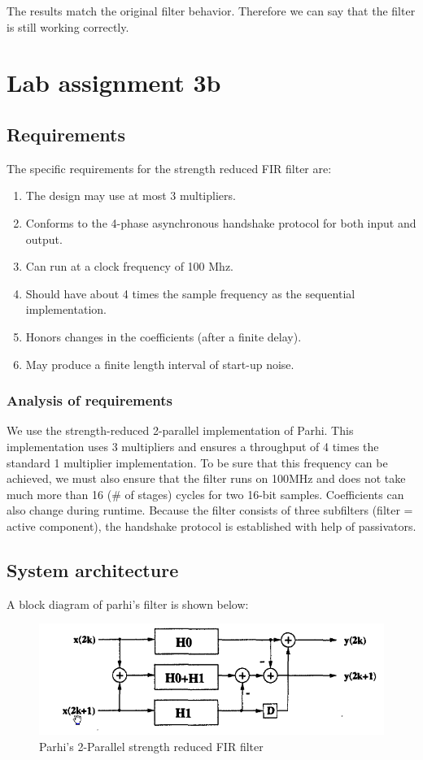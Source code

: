 \documentclass[a4paper,twoside,11pt, fleqn]{article}
\begin{document}
\newpage
The results match the original filter behavior. Therefore we can say that the filter is still working correctly.


\newpage
\section{Lab assignment 3b}
\subsection{Requirements}
The specific requirements for the strength reduced FIR filter are:
\begin{enumerate}
\item The design may use at most 3 multipliers.
\item Conforms to the 4-phase asynchronous handshake protocol for both input and output.
\item Can run at a clock frequency of 100 Mhz.
\item Should have about 4 times the sample frequency as the sequential implementation.
\item Honors changes in the coefficients (after a finite delay).
\item May produce a finite length interval of start-up noise.
\end{enumerate}
\subsubsection{Analysis of requirements}
We use the strength-reduced 2-parallel implementation of Parhi. This implementation uses 3 multipliers and ensures a throughput of 4 times the standard 1 multiplier implementation. To be sure that this frequency can be achieved, we must also ensure that the filter runs on 100MHz and does not take much more than 16 (\# of stages) cycles for two 16-bit samples. Coefficients can also change during runtime. Because the filter consists of three subfilters (filter = active component), the handshake protocol is established with help of passivators.

\subsection{System architecture}
 A block diagram of parhi's filter is shown below:
 
\begin{figure}[h]
	
	\includegraphics[scale = 0.71]{Images/3b_parhi}
    \caption{Parhi's 2-Parallel strength reduced FIR filter}
    \label{fig:3bparhi}
\end{figure}
\end{document}
